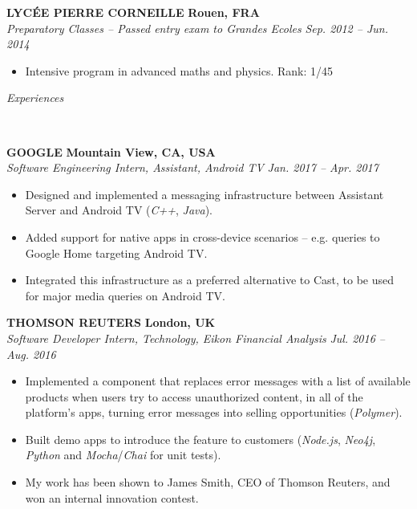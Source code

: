 \documentclass[a4paper, 12pt]{article}
\newcommand{\marginline}{-0.3cm}
\newcommand{\margincontent}{-0.6cm}
\newcommand{\marginbeforesection}{0.35cm}
\newcommand{\linewidthperso}{0.02cm}
\newcommand{\styletitle}[1]{\textbf{#1}}
\newcommand{\styledesc}[1]{\textit{#1}}
\newcommand{\styleloc}[1]{\textbf{#1}}
\newcommand{\styledates}[1]{\textit{#1}}
\newcommand{\stylesection}[1]{
  \vspace{\marginbeforesection}
  \begin{normalsize}\textit{#1}\end{normalsize}
  \vspace{\marginline}\\
  \noindent\makebox[\linewidth]{\rule{\textwidth}{\linewidthperso}}

}
\begin{document}
\begin{footnotesize}
\styletitle{LYC\'EE PIERRE CORNEILLE} \hfill \styleloc{Rouen, FRA}\\
\styledesc{Preparatory Classes -- Passed entry exam to Grandes Ecoles} \hfill \styledates{Sep. 2012 -- Jun. 2014}\\
\vspace{\margincontent}
\begin{itemize}
  \item Intensive program in advanced maths and physics. \hfill Rank: 1/45
\end{itemize}

\stylesection{Experiences}

\styletitle{GOOGLE} \hfill \styleloc{Mountain View, CA, USA}\\ 
\styledesc{Software Engineering Intern, Assistant, Android TV} \hfill \styledates{Jan. 2017 -- Apr. 2017}\\
\vspace{\margincontent}
\begin{itemize}
  \item Designed and implemented a messaging infrastructure between Assistant Server and Android TV (\textit{C++}, \textit{Java}).
  \item Added support for native apps in cross-device scenarios -- e.g. queries to Google Home targeting Android TV.
  \item Integrated this infrastructure as a preferred alternative to Cast, to be used for major media queries on Android TV.
\end{itemize}

\styletitle{THOMSON REUTERS} \hfill \styleloc{London, UK}\\ 
\styledesc{Software Developer Intern, Technology, Eikon Financial Analysis} \hfill \styledates{Jul. 2016 -- Aug. 2016}\\
\vspace{\margincontent}
\begin{itemize}
  \item Implemented a component that replaces error messages with a list of available products when users try to access unauthorized content, in all of the platform's apps, turning error messages into selling opportunities (\textit{Polymer}).
  \item Built demo apps to introduce the feature to customers (\textit{Node.js}, \textit{Neo4j}, \textit{Python} and \textit{Mocha}/\textit{Chai} for unit tests).
  \item My work has been shown to James Smith, CEO of Thomson Reuters, and won an internal innovation contest.
\end{itemize}


\end{footnotesize}
\end{document}
